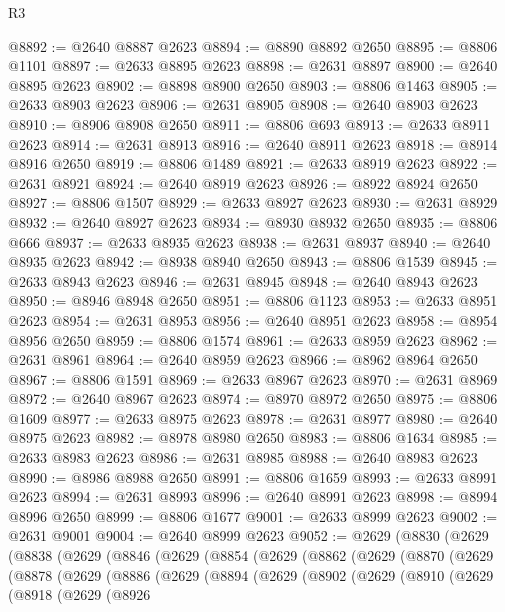 \begin{lexlean}{R3}
\begin{coremodule}
@8892 := @2640 @8887 @2623
@8894 := @8890 @8892 @2650
@8895 := @8806 @1101
@8897 := @2633 @8895 @2623
@8898 := @2631 @8897
@8900 := @2640 @8895 @2623
@8902 := @8898 @8900 @2650
@8903 := @8806 @1463
@8905 := @2633 @8903 @2623
@8906 := @2631 @8905
@8908 := @2640 @8903 @2623
@8910 := @8906 @8908 @2650
@8911 := @8806 @693
@8913 := @2633 @8911 @2623
@8914 := @2631 @8913
@8916 := @2640 @8911 @2623
@8918 := @8914 @8916 @2650
@8919 := @8806 @1489
@8921 := @2633 @8919 @2623
@8922 := @2631 @8921
@8924 := @2640 @8919 @2623
@8926 := @8922 @8924 @2650
@8927 := @8806 @1507
@8929 := @2633 @8927 @2623
@8930 := @2631 @8929
@8932 := @2640 @8927 @2623
@8934 := @8930 @8932 @2650
@8935 := @8806 @666
@8937 := @2633 @8935 @2623
@8938 := @2631 @8937
@8940 := @2640 @8935 @2623
@8942 := @8938 @8940 @2650
@8943 := @8806 @1539
@8945 := @2633 @8943 @2623
@8946 := @2631 @8945
@8948 := @2640 @8943 @2623
@8950 := @8946 @8948 @2650
@8951 := @8806 @1123
@8953 := @2633 @8951 @2623
@8954 := @2631 @8953
@8956 := @2640 @8951 @2623
@8958 := @8954 @8956 @2650
@8959 := @8806 @1574
@8961 := @2633 @8959 @2623
@8962 := @2631 @8961
@8964 := @2640 @8959 @2623
@8966 := @8962 @8964 @2650
@8967 := @8806 @1591
@8969 := @2633 @8967 @2623
@8970 := @2631 @8969
@8972 := @2640 @8967 @2623
@8974 := @8970 @8972 @2650
@8975 := @8806 @1609
@8977 := @2633 @8975 @2623
@8978 := @2631 @8977
@8980 := @2640 @8975 @2623
@8982 := @8978 @8980 @2650
@8983 := @8806 @1634
@8985 := @2633 @8983 @2623
@8986 := @2631 @8985
@8988 := @2640 @8983 @2623
@8990 := @8986 @8988 @2650
@8991 := @8806 @1659
@8993 := @2633 @8991 @2623
@8994 := @2631 @8993
@8996 := @2640 @8991 @2623
@8998 := @8994 @8996 @2650
@8999 := @8806 @1677
@9001 := @2633 @8999 @2623
@9002 := @2631 @9001
@9004 := @2640 @8999 @2623
@9052 := @2629
    (@8830
      (@2629
        (@8838
          (@2629
            (@8846
              (@2629
                (@8854
                  (@2629
                    (@8862
                      (@2629
                        (@8870
                          (@2629
                            (@8878
                              (@2629
                                (@8886
                                  (@2629
                                    (@8894
                                      (@2629
                                        (@8902
                                          (@2629
                                            (@8910
                                              (@2629
                                                (@8918
                                                  (@2629
                                                    (@8926

\end{coremodule}
\end{lexlean}

